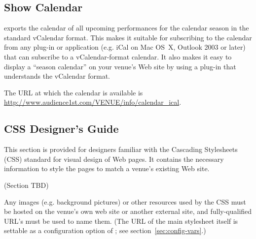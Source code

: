 \subsection{Show Calendar}
\label{sec:calendar}

\af exports the calendar of all upcoming performances for the calendar
season in the standard vCalendar format.  This makes it suitable for
subscribing to the calendar from any plug-in or application (e.g. iCal
on Mac OS~X, Outlook 2003 or later) that can subscribe to a
vCalendar-format calendar.  It also makes it easy to display a ``season
calendar'' on your venue's Web site by using a plug-in that understands
the vCalendar format.

The URL at which the calendar is available is
\url{http://www.audience1st.com/VENUE/info/calendar_ical}.

\subsection{CSS Designer's Guide}
\label{sec:creating_css}

This section is provided for designers familiar with the Cascading
Stylesheets (CSS) standard for visual design of Web pages.  It contains
the necessary information to style the \af pages to match a venue's
existing Web site.

(Section TBD)

Any images (e.g. background pictures) or other resources used by the CSS
must be hosted on the venue's own web site or another external site, and
fully-qualified URL's must be used to name them.  (The URL of the main
stylesheet itself is settable as a configuration option of \af; see
section~\ref{sec:config-vars}.)
